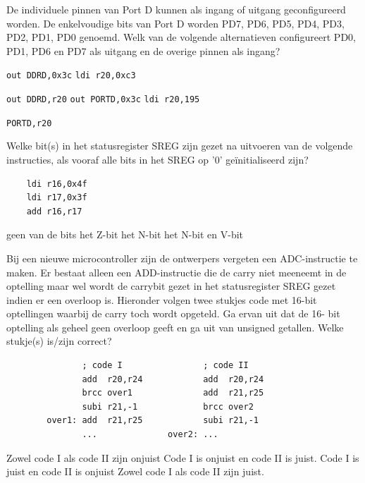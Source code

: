 \documentclass[a4paper,12pt,fleqn,dutch,mimicwordtwentyten]{tisdexam}
\begin{document}
\begin{questions}
\question
\label{opg:opg5}
De individuele pinnen van Port D kunnen als ingang of uitgang geconfigureerd worden. De
enkelvoudige bits van Port D worden PD7, PD6, PD5, PD4, PD3, PD2, PD1, PD0 genoemd.
Welk van de volgende alternatieven configureert PD0, PD1, PD6 en PD7 als uitgang en de
overige pinnen als ingang?
\begin{choices}
	\choice \lstinline|out DDRD,0x3c|
	\CorrectChoice \label{ans:opg5} \lstinline|ldi r20,0xc3| \par \lstinline|out DDRD,r20|
    \choice \lstinline|out PORTD,0x3c|
	\choice \lstinline|ldi r20,195| \par \lstinline|PORTD,r20|
\end{choices}


\question
\label{opg:opg6}
Welke bit(s) in het statusregister SREG zijn gezet na uitvoeren van de volgende
instructies, als vooraf alle bits in het SREG op '0' ge\"{i}nitialiseerd zijn?
\begin{lstlisting}
    ldi r16,0x4f
    ldi r17,0x3f
    add r16,r17
\end{lstlisting}
\begin{choices}
	\choice geen van de bits
	\choice het Z-bit
	\choice het N-bit
	\CorrectChoice \label{ans:opg6} het N-bit en V-bit
\end{choices}


\question
\label{opg:opg7}
Bij een nieuwe microcontroller zijn de ontwerpers vergeten een ADC-instructie te maken. Er
bestaat alleen een ADD-instructie die de carry niet meeneemt in de optelling maar wel wordt de
carrybit gezet in het statusregister SREG gezet indien er een overloop is. Hieronder volgen twee
stukjes code met 16-bit optellingen waarbij de carry toch wordt opgeteld. Ga ervan uit dat de 16-
bit optelling als geheel geen overloop geeft en ga uit van unsigned getallen. Welke stukje(s)
is/zijn correct?
\begin{lstlisting}
               ; code I                ; code II
               add  r20,r24            add  r20,r24
               brcc over1              add  r21,r25
               subi r21,-1             brcc over2
        over1: add  r21,r25            subi r21,-1
               ...              over2: ...
\end{lstlisting}
\begin{choices}
	\choice Zowel code I als code II zijn onjuist
	\choice Code I is onjuist en code II is juist.
	\CorrectChoice \label{ans:opg7} Code I is juist en code II is onjuist
	\choice Zowel code I als code II zijn juist.
\end{choices}



\end{questions}
\end{document}
